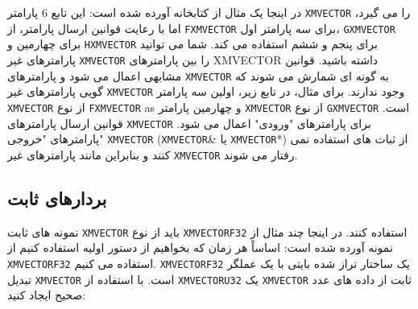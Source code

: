 {\begin{spacing}{1.5}
        در اینجا یک مثال از کتابخانه  آورده شده است:
        \textbf{\vspace{6pt}}
        \lr{}
        \textbf{\vspace{6pt}}
        این تابع 6 پارامتر \texttt{XMVECTOR} را می گیرد، اما با رعایت قوانین ارسال پارامتر، از \texttt{FXMVECTOR} برای سه پارامتر اول، \texttt{GXMVECTOR} برای چهارمین و \texttt{HXMVECTOR} برای پنجم و ششم استفاده می کند.
        شما می توانید پارامترهای غیر \texttt{XMVECTOR} را بین پارامترهای XMVECTOR داشته باشید.
        قوانین مشابهی اعمال می شود و پارامترهای \texttt{XMVECTOR} به گونه ای شمارش می شوند که گویی پارامترهای غیر \texttt{XMVECTOR} وجود ندارند.
        برای مثال، در تابع زیر، اولین سه پارامتر \texttt{XMVECTOR} از نوع \texttt{FXMVECTOR} as و چهارمین پارامتر \texttt{XMVECTOR} از نوع \texttt{GXMVECTOR} است.
        \textbf{\vspace{6pt}}
        \lr{}
        \textbf{\vspace{6pt}}
        قوانین ارسال پارامترهای \texttt{XMVECTOR} برای پارامترهای "ورودی" اعمال می شود.
        پارامترهای "خروجی" \texttt{XMVECTOR} (\texttt{XMVECTOR}\& یا \texttt{XMVECTOR}*) از ثبات های  استفاده نمی کنند و بنابراین مانند پارامترهای غیر \texttt{XMVECTOR} رفتار می شوند.
    \end{spacing}
}

\subsection{\textbf{بردارهای ثابت}}
\label{subsec:1.6.4}
{
    \Large
    \begin{spacing}{1.5}
        نمونه های ثابت \texttt{XMVECTOR} باید از نوع \texttt{XMVECTORF32} استفاده کنند. در اینجا چند مثال از نمونه  آورده شده است:
        \textbf{\vspace{6pt}}
        \lr{}
        \textbf{\vspace{6pt}}
        اساساً هر زمان که بخواهیم از دستور اولیه استفاده کنیم از \texttt{XMVECTORF32} استفاده می کنیم.
        \texttt{XMVECTORF32} یک ساختار تراز شده  بایتی با یک عملگر تبدیل \texttt{XMVECTOR} است.
        \textbf{\vspace{6pt}}
        \lr{}
        \textbf{\vspace{6pt}}
        با استفاده از \texttt{XMVECTORU32} یک \texttt{XMVECTOR} ثابت از داده های عدد صحیح ایجاد کنید:
        \textbf{\vspace{6pt}}
        \lr{}
    \end{spacing}
}

